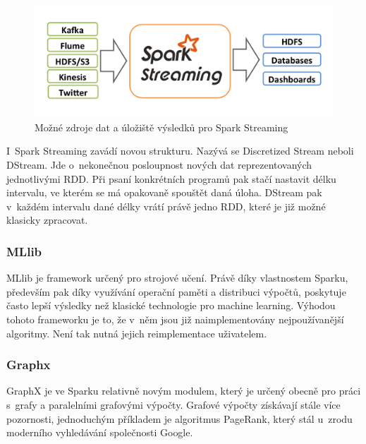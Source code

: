 \documentclass[thesis=B,czech]{FITthesis}[2012/06/26]
\begin{document}
	\begin{figure}[ht]
    	\centering
    	\includegraphics[width=1\textwidth]{images/spark-streaming-arch.png}
    	\caption{Možné zdroje dat a úložiště výsledků pro Spark Streaming\cite{streaming-guide}}
    	\label{fig:spark_streaming_arch}
	\end{figure}
	
	I~Spark Streaming zavádí novou strukturu. Nazývá se Discretized Stream neboli DStream. Jde o~nekonečnou posloupnost nových dat reprezentovaných jednotlivými RDD. Při psaní konkrétních programů pak stačí nastavit délku intervalu, ve kterém se má opakovaně spouštět daná úloha. DStream pak v~každém intervalu dané délky vrátí právě jedno RDD, které je již možné klasicky zpracovat. 
	

\subsubsection{MLlib}
	MLlib je framework určený pro strojové učení. Právě díky vlastnostem Sparku, především pak díky využívání operační paměti a distribuci výpočtů, poskytuje často lepší výsledky než klasické technologie pro machine learning\cite{MLlib}. Výhodou tohoto frameworku je to, že v~něm jsou již naimplementovány nejpoužívanější algoritmy. Není tak nutná jejich reimplementace uživatelem. 

	
\subsubsection{Graphx}
	GraphX je ve Sparku relativně novým modulem, který je určený obecně pro práci s~grafy a paralelními grafovými výpočty. Grafové výpočty získávají stále více pozornosti, jednoduchým příkladem je algoritmus PageRank, který stál u~zrodu moderního vyhledávání společnosti Google\cite{google-pagerank}. 
	


\end{document}
